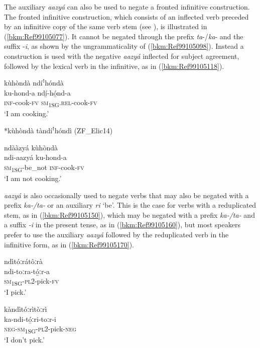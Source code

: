The auxiliary \textit{aazyá} can also be used to negate a fronted infinitive construction. The fronted infinitive construction, which consists of an inflected verb preceded by an infinitive copy of the same verb stem (see ), is illustrated in (\ref{bkm:Ref99105077}). It cannot be negated through the prefix \textit{ta}-/\textit{ka}- and the suffix -\textit{i}, as shown by the ungrammaticality of (\ref{bkm:Ref99105098}). Instead a construction is used with the negative \textit{aazyá} inflected for subject agreement, followed by the lexical verb in the infinitive, as in (\ref{bkm:Ref99105118}).

\ea
\label{bkm:Ref99105077}
kùhòndà ndíꜝhóndà\\
\gll ku-hond-a  ndí̲-hó̲nd-a\\
\textsc{inf}-cook-\textsc{fv}  \textsc{sm}\textsubscript{1SG}.\textsc{rel}-cook-\textsc{fv}\\
\glt ‘I am cooking.’
\z

\ea
\label{bkm:Ref99105098}
*kùhòndà tàndíꜝhóndì (ZF\_Elic14)
\z

\ea
\label{bkm:Ref99105118}
ndààzyá kùhòndà\\
\gll ndi-aazyá  ku-hond-a\\
\textsc{sm}\textsubscript{1SG}-be\_not  \textsc{inf}-cook-\textsc{fv}\\
\glt ‘I am not cooking.’
\z

\textit{aazyá} is also occasionally used to negate verbs that may also be negated with a prefix \textit{ka-/ta-} or an auxiliary \textit{ri} ‘be’. This is the case for verbs with a reduplicated stem, as in (\ref{bkm:Ref99105150}), which may be negated with a prefix \textit{ka-/ta-} and a suffix \textit{-i} in the present tense, as in (\ref{bkm:Ref99105160}), but most speakers prefer to use the auxiliary \textit{aazyá} followed by the reduplicated verb in the infinitive form, as in (\ref{bkm:Ref99105170}).

\ea
\label{bkm:Ref99105150}
\glll ndìtóːrátôːrà\\
ndi-toːra-tó̲ːr-a\\
\textsc{sm}\textsubscript{1SG}-\textsc{pl}2-pick-\textsc{fv}\\
\glt ‘I pick.’
\z

\ea
\label{bkm:Ref99105160}
\glll kàndìtóːrìtòːrì\\
ka-ndi-tó̲ːri-toːr-i\\
\textsc{neg}-\textsc{sm}\textsubscript{1SG}-\textsc{pl}2-pick-\textsc{neg}\\
\glt ‘I don’t pick.’
\z

